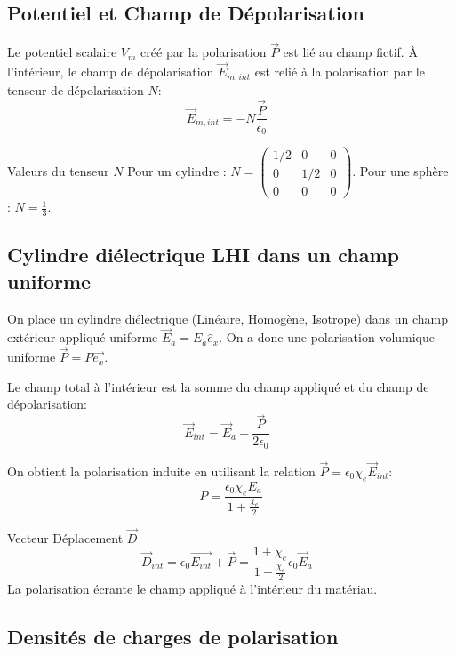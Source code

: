 \documentclass[french]{yLectureNote}
\renewcommand{\vec}{\overrightarrow}
\begin{document}
\subsection{Potentiel et Champ de Dépolarisation}

Le potentiel scalaire $V_m$ créé par la polarisation $\vec{P}$ est lié au champ fictif. À l'intérieur, le champ de dépolarisation $\vec{E}_{m,int}$ est relié à la polarisation par le tenseur de dépolarisation $N$:
$$\vec{E}_{m,int} = -N \frac{\vec{P}}{\epsilon_0} \text{ }$$

 Valeurs du tenseur $N$
 Pour un cylindre : $N = \begin{pmatrix} 1/2 & 0 & 0 \\ 0 & 1/2 & 0 \\ 0 & 0 & 0 \end{pmatrix}$.
 Pour une sphère : $N = \frac{1}{3}$.


\subsection{Cylindre diélectrique LHI dans un champ uniforme}

On place un cylindre diélectrique (Linéaire, Homogène, Isotrope) dans un champ extérieur appliqué  uniforme $\vec{E}_a = E_a \hat{e}_x$. On a donc une polarisation volumique uniforme $\vec{P} = P\vec{e_x}$.


Le champ total à l'intérieur est la somme du champ appliqué et du champ de dépolarisation:
$$\vec{E}_{int} = \vec{E}_a - \frac{\vec{P}}{2\epsilon_0} \text{ }$$

 On obtient la polarisation induite en utilisant la relation $\vec{P} = \epsilon_0 \chi_e \vec{E}_{int}$:
$$P = \frac{\epsilon_0 \chi_e E_a}{1 + \frac{\chi_e}{2}}$$

 Vecteur Déplacement $\vec{D}$
$$\vec{D}_{int} =\epsilon_0 \vec{E_{int}}+\vec{P} =  \frac{1 + \chi_e}{1 + \frac{\chi_e}{2}} \epsilon_0 \vec{E}_a \text{ }$$
La polarisation écrante le champ appliqué à l'intérieur du matériau.



\subsection{Densités de charges de polarisation}
\end{document}
